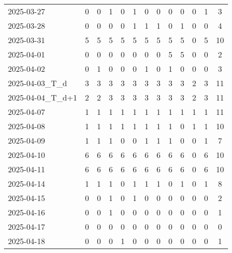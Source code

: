\documentclass[dvipdfmx,oneside]{article}
\begin{document}
\begin{longtable}{lcccccccccccc}
        2025-03-27 &     0 &     0 &     1 &     0 &     1 &     0 &     0 &     0 &     0 &     0 &     1 &      3 \\
        2025-03-28 &     0 &     0 &     0 &     0 &     1 &     1 &     1 &     0 &     1 &     0 &     0 &      4 \\
        2025-03-31 &     5 &     5 &     5 &     5 &     5 &     5 &     5 &     5 &     5 &     0 &     5 &     10 \\
        2025-04-01 &     0 &     0 &     0 &     0 &     0 &     0 &     0 &     5 &     5 &     0 &     0 &      2 \\
        2025-04-02 &     0 &     1 &     0 &     0 &     0 &     1 &     0 &     1 &     0 &     0 &     0 &      3 \\
  2025-04-03\_T\_d &     3 &     3 &     3 &     3 &     3 &     3 &     3 &     3 &     3 &     2 &     3 &     11 \\
2025-04-04\_T\_d+1 &     2 &     2 &     3 &     3 &     3 &     3 &     3 &     3 &     3 &     2 &     3 &     11 \\
        2025-04-07 &     1 &     1 &     1 &     1 &     1 &     1 &     1 &     1 &     1 &     1 &     1 &     11 \\
        2025-04-08 &     1 &     1 &     1 &     1 &     1 &     1 &     1 &     1 &     0 &     1 &     1 &     10 \\
        2025-04-09 &     1 &     1 &     1 &     0 &     0 &     1 &     1 &     1 &     0 &     0 &     1 &      7 \\
        2025-04-10 &     6 &     6 &     6 &     6 &     6 &     6 &     6 &     6 &     6 &     0 &     6 &     10 \\
        2025-04-11 &     6 &     6 &     6 &     6 &     6 &     6 &     6 &     6 &     6 &     0 &     6 &     10 \\
        2025-04-14 &     1 &     1 &     1 &     0 &     1 &     1 &     1 &     0 &     1 &     0 &     1 &      8 \\
        2025-04-15 &     0 &     0 &     1 &     0 &     1 &     0 &     0 &     0 &     0 &     0 &     0 &      2 \\
        2025-04-16 &     0 &     0 &     1 &     0 &     0 &     0 &     0 &     0 &     0 &     0 &     0 &      1 \\
        2025-04-17 &     0 &     0 &     0 &     0 &     0 &     0 &     0 &     0 &     0 &     0 &     0 &      0 \\
        2025-04-18 &     0 &     0 &     0 &     1 &     0 &     0 &     0 &     0 &     0 &     0 &     0 &      1 \\

\end{longtable}
\end{document}
